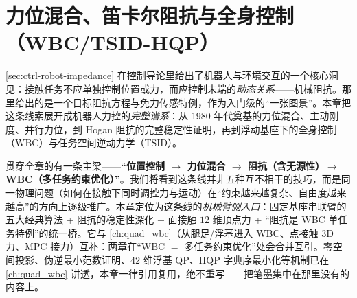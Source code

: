 \chapter{力位混合、笛卡尔阻抗与全身控制（WBC/TSID-HQP）}
\label{ch:force-wbc}


\cref{sec:ctrl-robot-impedance} 在控制导论里给出了机器人与环境交互的一个核心洞见：接触任务不应单独控制位置或力，而应控制末端的\emph{动态关系}——机械阻抗。那里给出的是一个目标阻抗方程与免力传感特例，作为入门级的“一张图景”。本章把这条线索展开成机器人力控的\emph{完整谱系}：从 1980 年代奠基的力位混合、主动刚度、并行力位，到 Hogan 阻抗的完整稳定性证明，再到浮动基座下的全身控制（WBC）与任务空间逆动力学（TSID）。

贯穿全章的有一条主梁——\textbf{“位置控制 $\to$ 力位混合 $\to$ 阻抗（含无源性）$\to$ WBC（多任务约束优化）”}。我们将看到这条线并非五种互不相干的技巧，而是同一物理问题（如何在接触下同时调控力与运动）在“约束越来越复杂、自由度越来越高”的方向上逐级推广。本章定位为这条线的\emph{机械臂侧入口}：固定基座串联臂的五大经典算法 + 阻抗的稳定性深化 + 面接触 $12$ 维顶点力 + “阻抗是 WBC 单任务特例”的统一桥。它与 \cref{ch:quad_wbc}（从腿足/浮基进入 WBC、点接触 $3$D 力、MPC 接力）互补：两章在“WBC $=$ 多任务约束优化”处会合并互引。零空间投影、伪逆最小范数证明、$42$ 维浮基 QP、HQP 字典序最小化等机制已在 \cref{ch:quad_wbc} 讲透，本章一律引用复用，绝不重写——把笔墨集中在那里没有的内容上。

